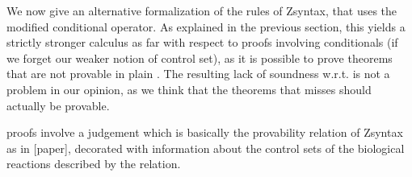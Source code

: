 




We now give an alternative formalization of the rules of Zsyntax, that uses the
modified conditional operator. As explained in the previous section, this yields
a strictly stronger calculus as far with respect to proofs involving
conditionals (if we forget our weaker notion of control set), as it is possible
to prove theorems that are not provable in plain \znd{}. The resulting lack of
soundness w.r.t. \znd{} is not a problem in our opinion, as we think that the
theorems that \znd{} misses should actually be provable.


\eznd{} proofs involve a judgement which is basically the provability relation
of Zsyntax as in [paper], decorated with information about the control sets of
the biological reactions described by the relation.

